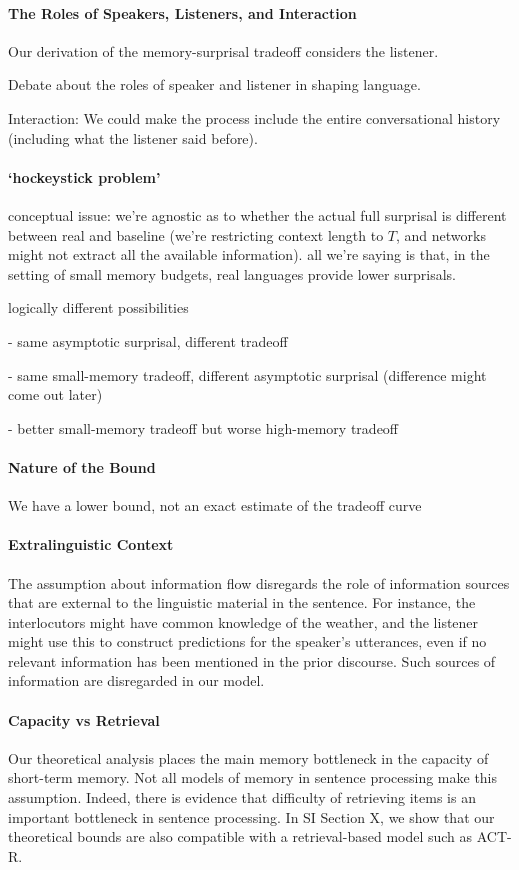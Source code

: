\paragraph{The Roles of Speakers, Listeners, and Interaction}
Our derivation of the memory-surprisal tradeoff considers the listener.

Debate about the roles of speaker and listener in shaping language.

Interaction: We could make the process include the entire conversational history (including what the listener said before).


\paragraph{`hockeystick problem'} conceptual issue: we're agnostic as to whether the actual full surprisal is different between real and baseline (we're restricting context length to $T$, and networks might not extract all the available information). all we're saying is that, in the setting of small memory budgets, real languages provide lower surprisals.

logically different possibilities

- same asymptotic surprisal, different tradeoff

- same small-memory tradeoff, different asymptotic surprisal (difference might come out later)

- better small-memory tradeoff but worse high-memory tradeoff

\paragraph{Nature of the Bound}
We have a lower bound, not an exact estimate of the tradeoff curve

\paragraph{Extralinguistic Context}
The assumption about information flow disregards the role of information sources that are external to the linguistic material in the sentence.
For instance, the interlocutors might have common knowledge of the weather, and the listener might use this to construct predictions for the speaker's utterances, even if no relevant information has been mentioned in the prior discourse.
Such sources of information are disregarded in our model.

\paragraph{Capacity vs Retrieval}
Our theoretical analysis places the main memory bottleneck in the capacity of short-term memory.
Not all models of memory in sentence processing make this assumption.
Indeed, there is evidence that difficulty of retrieving items is an important bottleneck in sentence processing.
In SI Section X, we show that our theoretical bounds are also compatible with a retrieval-based model such as ACT-R.


